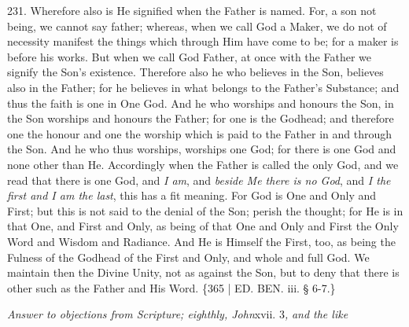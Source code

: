 231. Wherefore also is He signified
when the Father is named. For, a son not being, we cannot say father;
whereas, when we call God a Maker, we do not of necessity manifest the
things which through Him have come to be; for a maker is before his
works. But when we call God Father, at once with the Father we signify
the Son's existence. Therefore also he who believes in the Son,
believes also in the Father; for he believes in what belongs to the
Father's Substance; and thus the faith is one in One God. And he who
worships and honours the Son, in the Son worships and honours the
Father; for one is the Godhead; and therefore one the honour and one
the worship which is paid to the Father in and through the Son. And he
who thus worships, worships one God; for there is one God and none
other than He. Accordingly when the Father is called the only God, and
we read that there is one God, and \emph{I am}, and \emph{beside Me there
is no God}, and \emph{I the first and I am the last}, this has a
fit meaning. For God is One and Only and First; but this is not said
to the denial of the Son; perish the thought; for He is in that One,
and First and Only, as being of that One and Only and First the Only
Word and Wisdom and Radiance. And He is Himself the First, too, as
being the Fulness of the Godhead of the First and Only, and whole and
full God. We maintain then the Divine Unity, not as against the Son,
but to deny that there is other such as the Father and His Word. \{365
| ED.
BEN. iii. § 6-7.\}


\emph{Answer to objections from Scripture; eighthly, John}xvii.
3\emph{,} \emph{and the like}

